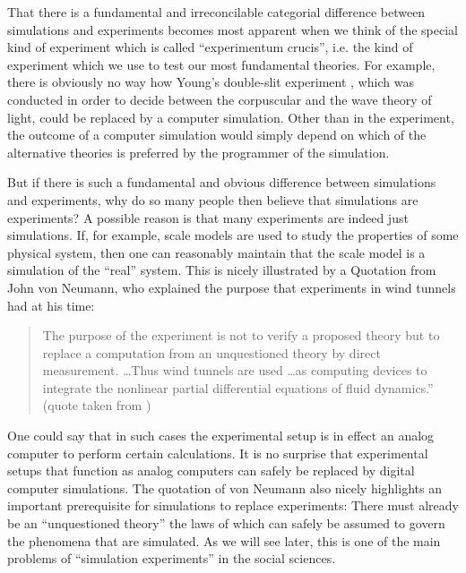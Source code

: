 \documentclass[onecollarge]{STJour}
\numberwithin{equation}{section}
\begin{document}
That there is a fundamental and irreconcilable categorial difference
between simulations and experiments becomes most apparent when we think
of the special kind of experiment which is called ``experimentum
crucis'', i.e. the kind of experiment which we use to test our most
fundamental theories. For example, there is obviously no way how Young's
double-slit experiment \citep{wikipedia:double_slit}, which was conducted
in order to decide between the corpuscular and the wave theory of light,
could be replaced by a computer simulation. Other than in the
experiment, the outcome of a computer simulation would simply depend on
which of the alternative theories is preferred by the programmer of the
simulation.

But if there is such a fundamental and obvious difference between
simulations and experiments, why do so many people then believe that
simulations are experiments? A possible reason is that many experiments
are indeed just simulations. If, for example, scale models are used to
study the properties of some physical system, then one can reasonably
maintain that the scale model is a simulation of the ``real'' system.
This is nicely illustrated by a Quotation from John von Neumann, who
explained the purpose that experiments in wind tunnels had at his time:

\begin{quote}
The purpose of the experiment is not to verify a proposed theory but to
replace a computation from an unquestioned theory by direct
measurement. \ldots Thus wind tunnels are used \ldots as computing
devices to integrate the nonlinear partial differential equations of
fluid dynamics.'' (quote taken from \citep[p.\ 114]{winsberg:2003})
\end{quote}

One could say that in such cases the experimental setup is in effect an
analog computer to perform certain calculations. It is no surprise that
experimental setups that function as analog computers can safely be
replaced by digital computer simulations. The quotation of von Neumann
also nicely highlights an important prerequisite for simulations to
replace experiments: There must already be an ``unquestioned
theory'' the laws of which can safely be assumed to govern the
phenomena that are simulated. As we will see later, this is one of the
main problems of ``simulation experiments'' in the social sciences.
\end{document}
